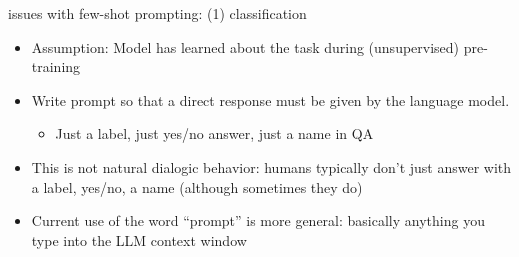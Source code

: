 \begin{frame}{issues with few-shot prompting: (1) classification}

\vfill

\begin{itemize}
    \item Assumption: Model has learned about the task during (unsupervised) pre-training 
    \item Write prompt so that  a direct response must be
    given by the language model.
\begin{itemize}
        \item Just a label, just yes/no answer, just a name
    in QA
\end{itemize}
    \item This is not natural dialogic behavior: humans
    typically don't
    just answer with a label, yes/no, a name (although
    sometimes they do)
\item Current use of the word ``prompt'' is more general: basically
anything you type into the LLM context window

\end{itemize}

\vfill

\end{frame}



